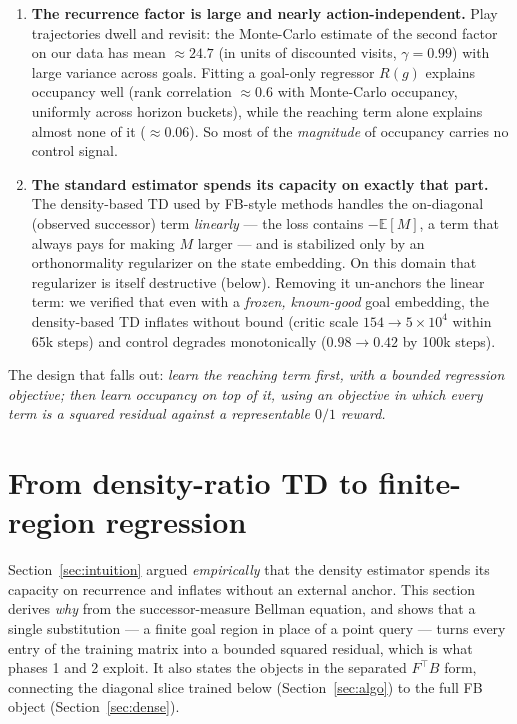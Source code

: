 \documentclass[10pt]{article}
\newcommand{\E}{\mathbb{E}}
\begin{document}
\begin{enumerate}
  \item \textbf{The recurrence factor is large and nearly action-independent.}
  Play trajectories dwell and revisit: the Monte-Carlo estimate of the second factor on our data has mean $\approx 24.7$ (in units of discounted visits, $\gamma=0.99$) with large variance across goals.
  Fitting a goal-only regressor $R(g)$ explains occupancy well (rank correlation $\approx 0.6$ with Monte-Carlo occupancy, uniformly across horizon buckets), while the reaching term alone explains almost none of it ($\approx 0.06$).
  So most of the \emph{magnitude} of occupancy carries no control signal.

  \item \textbf{The standard estimator spends its capacity on exactly that part.}
  The density-based TD used by FB-style methods handles the on-diagonal (observed successor) term \emph{linearly} --- the loss contains $-\E[M]$, a term that always pays for making $M$ larger --- and is stabilized only by an orthonormality regularizer on the state embedding.
  On this domain that regularizer is itself destructive (below).
  Removing it un-anchors the linear term: we verified that even with a \emph{frozen, known-good} goal embedding, the density-based TD inflates without bound (critic scale $154\to 5\times10^{4}$ within 65k steps) and control degrades monotonically ($0.98\to0.42$ by 100k steps).
\end{enumerate}

The design that falls out: \emph{learn the reaching term first, with a bounded regression objective; then learn occupancy on top of it, using an objective in which every term is a squared residual against a representable $0/1$ reward.}

\section{From density-ratio TD to finite-region regression}
\label{sec:density-to-kernel}

Section~\ref{sec:intuition} argued \emph{empirically} that the density estimator
spends its capacity on recurrence and inflates without an external anchor.
This section derives \emph{why} from the successor-measure Bellman equation, and shows
that a single substitution --- a finite goal region in place of a point query --- turns
every entry of the training matrix into a bounded squared residual, which is what phases
1 and 2 exploit.
It also states the objects in the separated $F^{\top}B$ form, connecting the diagonal
slice trained below (Section~\ref{sec:algo}) to the full FB object
(Section~\ref{sec:dense}).
\end{document}
